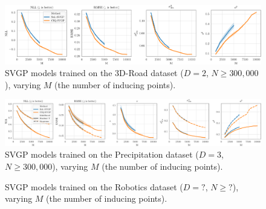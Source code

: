 
\begin{figure}[t!]
  \centering
  \includegraphics[width=\linewidth]{figures/3droad.pdf}
  \caption{
    SVGP models trained on the 3D-Road dataset ($D=2$, $N\geq300,\!000$), varying $M$ (the number of inducing points).
  }
  \label{fig:3droad}
\end{figure}

\begin{figure}[t!]
  \centering
  \includegraphics[width=\linewidth]{figures/precip.pdf}
  \caption{
    SVGP models trained on the Precipitation dataset ($D=3$, $N\geq300,\!000$), varying $M$ (the number of inducing points).
  }
  \label{fig:precip}
\end{figure}

\begin{figure}[t!]
  \centering
  \caption{
    SVGP models trained on the Robotics dataset ($D=?$, $N\geq?$), varying $M$ (the number of inducing points).
  }
  \label{fig:robotics}
\end{figure}
